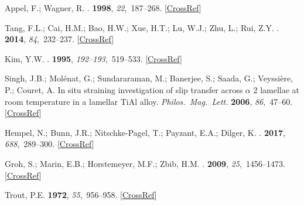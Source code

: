\documentclass[materials,article,accept,moreauthors,pdftex,10pt,a4paper]{Definitions/mdpi}
\begin{document}
\begin{thebibliography}{999}
Appel, F.; Wagner, R.
.
 {\bf 1998}, {\em
22},~187--268. [\href{http://dx.doi.org/10.1016/S0927-796X(97)00018-1}{CrossRef}]

Tang, F.L.; Cai, H.M.; Bao, H.W.; Xue, H.T.; Lu, W.J.; Zhu, L.; Rui, Z.Y.
.
 {\bf 2014}, {\em 84},~232--237. [\href{http://dx.doi.org/10.1016/j.commatsci.2013.12.014}{CrossRef}]

Kim, Y.W.
.
 {\bf 1995}, {\em
192--193},~519--533. [\href{http://dx.doi.org/10.1016/0921-5093(94)03271-8}{CrossRef}]

{Singh, J.B.}; Mol{\'{e}}nat, G.; Sundararaman, M.; Banerjee, S.; Saada, G.;
Veyssi{\`{e}}re, P.; Couret, A. In situ straining investigation of slip transfer across $\alpha$ 2
lamellae at room temperature in a lamellar TiAl alloy. {\em \mbox{Philos. Mag. Lett.}} {\bf 2006}, {\em 86},~47--60. [\href{http://dx.doi.org/10.1080/09500830500497066}{CrossRef}]%

Hempel, N.; Bunn, J.R.; Nitschke-Pagel, T.; Payzant, E.A.; Dilger, K.
.
 {\bf 2017}, {\em
688},~289--300. [\href{http://dx.doi.org/10.1016/j.msea.2017.02.005}{CrossRef}]

Groh, S.; Marin, E.B.; Horstemeyer, M.F.; Zbib, H.M.
.
 {\bf 2009}, {\em
25},~1456--1473. [\href{http://dx.doi.org/10.1016/j.ijplas.2008.11.003}{CrossRef}]

Trout, P.E.
 {\bf 1972}, {\em 55},~956--958. [\href{http://dx.doi.org/10.1016/j.cma.2018.06.026}{CrossRef}]


\end{thebibliography}
\end{document}
